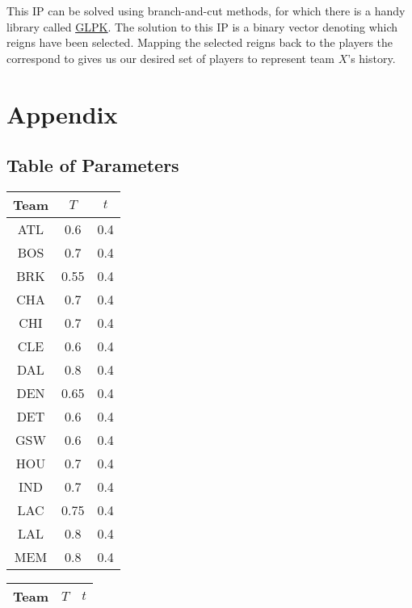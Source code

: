 \documentclass[a4paper,11pt]{article}
\begin{document}
This IP can be solved using branch-and-cut methods, for which there is a handy library called \textcolor{blue}{\underline{\href{http://www.gnu.org/software/glpk/}{GLPK}}}. The solution to this IP is a binary vector denoting which reigns have been selected. Mapping the selected reigns back to the players the correspond to gives us our desired set of players to represent team $X$'s history.

\section{Appendix}
\subsection{Table of Parameters}
\begin{table}[ht]
  \begin{minipage}[b]{0.6\linewidth}\centering
    \begin{tabular}{|c|c|c|}
    \hline
    Team & $T$ & $t$ \\ \hline
    ATL  & 0.6   & 0.4   \\ \hline
    BOS  & 0.7   & 0.4   \\ \hline
    BRK  & 0.55  & 0.4   \\ \hline
    CHA  & 0.7   & 0.4   \\ \hline
    CHI  & 0.7   & 0.4   \\ \hline
    CLE  & 0.6   & 0.4   \\ \hline
    DAL  & 0.8   & 0.4   \\ \hline
    DEN  & 0.65  & 0.4   \\ \hline
    DET  & 0.6   & 0.4   \\ \hline
    GSW  & 0.6   & 0.4   \\ \hline
    HOU  & 0.7   & 0.4   \\ \hline
    IND  & 0.7   & 0.4   \\ \hline
    LAC  & 0.75  & 0.4   \\ \hline
    LAL  & 0.8   & 0.4   \\ \hline
    MEM  & 0.8   & 0.4   \\ \hline
    \end{tabular}
  \end{minipage}
  \hspace{-.2\linewidth}
  \begin{minipage}[b]{0.6\linewidth}\centering
    \begin{tabular}{|c|c|c|}
    \hline
    Team & $T$ & $t$ \\ \hline

\end{tabular}
\end{minipage}
\end{table}
\end{document}
